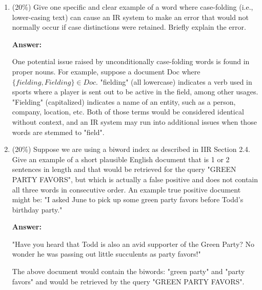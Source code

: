 \documentclass[11pt]{article}
\begin{document}
\begin{enumerate}
        \item (20\%) Give one specific and clear example of a word where case-folding (i.e., lower-casing text) can cause an IR system to make an error that would not normally occur if case distinctions were retained. Briefly explain the error.
        
        \textbf{Answer:}
        
        One potential issue raised by unconditionally case-folding words is found in proper nouns. For example, suppose a document Doc where $\{fielding, Fielding\} \in Doc$. "fielding" (all lowercase) indicates a verb used in sports where a player is sent out to be active in the field, among other usages. "Fielding" (capitalized) indicates a name of an entity, such as a person, company, location, etc. Both of those terms would be considered identical without context, and an IR system may run into additional issues when those words are stemmed to "field".
        
        \item (20\%) Suppose we are using a biword index as described in IIR Section 2.4. Give an example of a short plausible English document that is 1 or 2 sentences in length and that would be retrieved for the query "GREEN PARTY FAVORS", but which is actually a false positive and does not contain all three words in consecutive order. An example true positive document might be: "I asked June to pick up some green party favors before Todd's birthday party."
        
        \textbf{Answer:}
        
        "Have you heard that Todd is also an avid supporter of the Green Party? No wonder he was passing out little succulents as party favors!"
        
        The above document would contain the biwords: "green party" and "party favors" and would be retrieved by the query "GREEN PARTY FAVORS".
        
    \end{enumerate}
\end{document}
